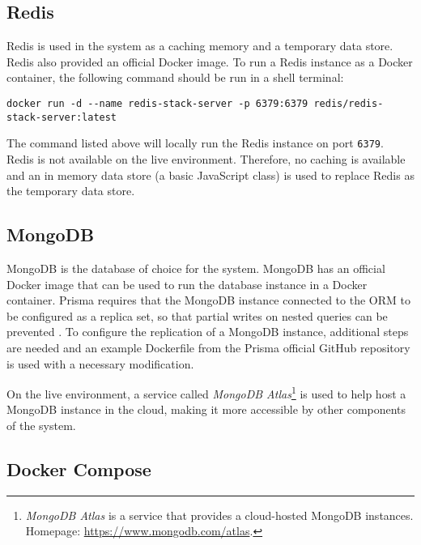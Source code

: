 \subsection{Redis}
 Redis is used in the system as a caching memory and a temporary data store. Redis also provided an official Docker image. To run a Redis instance as a Docker container, the following command should be run in a shell terminal:

 \begin{lstlisting}[caption={Running a Redis instance with Docker (Shell)}]
 docker run -d --name redis-stack-server -p 6379:6379 redis/redis-stack-server:latest
 \end{lstlisting}

 The command listed above will locally run the Redis instance on port \verb;6379;. Redis is not available on the live environment. Therefore, no caching is available and an in memory data store (a basic JavaScript class) is used to replace Redis as the temporary data store.

 \subsection{MongoDB}
 MongoDB is the database of choice for the system. MongoDB has an official Docker image that can be used to run the database instance in a Docker container. Prisma requires that the MongoDB instance connected to the ORM to be configured as a replica set, so that partial writes on nested queries can be prevented \autocite{primsa-mongo}. To configure the replication of a MongoDB instance, additional steps are needed and an example Dockerfile from the Prisma official GitHub repository is used \autocite{prisma-dockerfile} with a necessary modification.

 On the live environment, a service called \emph{MongoDB Atlas}\footnote{\emph{MongoDB Atlas} is a service that provides a cloud-hosted MongoDB instances. Homepage: \url{https://www.mongodb.com/atlas}.} is used to help host a MongoDB instance in the cloud, making it more accessible by other components of the system.
 

 \subsection{Docker Compose}

